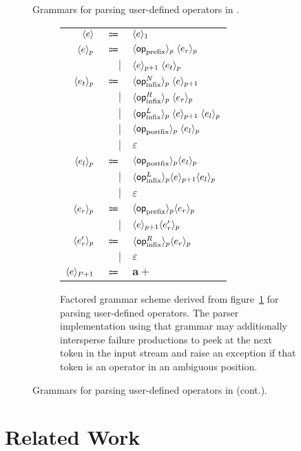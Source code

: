 {\begin{figure}[!htb]
\begin{subfigure}{\linewidth}
{}
\label{figure:user-defined-operators-initial-grammar-scheme}
\end{subfigure}
\caption[Grammars for parsing user-defined operators in \Beluga.]{Grammars for parsing user-defined operators in \Beluga.}
\label{figure:user-defined-operators-grammar}
\end{figure}%
\begin{figure}\ContinuedFloat
\begin{subfigure}{\linewidth}
\centering
\begin{tabular}{rrl}
$ \langle e\rangle $ & $ \Coloneqq $ & $ \langle e\rangle_1 $\\
$ \langle e\rangle_p $ & $ \Coloneqq $ & $ \langle\mathsf{op}_{\text{prefix}}\rangle_p \; \langle e_r\rangle_p $\\
& $ \mid $ & $ \langle e\rangle_{p + 1} \; \langle e_t\rangle_p $\\
$ \langle e_t\rangle_p $ & $ \Coloneqq $ & $ \langle\mathsf{op}_{\text{infix}}^N\rangle_p \; \langle e\rangle_{p + 1} $\\
& $ \mid $ & $ \langle\mathsf{op}_{\text{infix}}^R\rangle_p \; \langle e_r\rangle_p $\\
& $ \mid $ & $ \langle\mathsf{op}_{\text{infix}}^L\rangle_p \; \langle e\rangle_{p + 1} \; \langle e_l\rangle_p $\\
& $ \mid $ & $ \langle\mathsf{op}_{\text{postfix}}\rangle_p \; \langle e_l\rangle_p $\\
& $ \mid $ & $ \varepsilon $\\
$ \langle e_l\rangle_p $ & $ \Coloneqq $ & $ \langle\mathsf{op}_{\text{postfix}}\rangle_p \langle e_l\rangle_p $\\
& $ \mid $ & $ \langle\mathsf{op}_{\text{infix}}^L\rangle_p \langle e\rangle_{p + 1} \langle e_l\rangle_p $\\
& $ \mid $ & $ \varepsilon $\\
$ \langle e_r\rangle_p $ & $ \Coloneqq $ & $ \langle\mathsf{op}_{\text{prefix}}\rangle_p \langle e_r\rangle_p $\\
& $ \mid $ & $ \langle e\rangle_{p + 1} \langle e_r'\rangle_p $\\
$ \langle e_r'\rangle_p $ & $ \Coloneqq $ & $ \langle\mathsf{op}_{\text{infix}}^R\rangle_p \langle e_r\rangle_p $\\
& $ \mid $ & $ \varepsilon $\\
$ \langle e\rangle_{P + 1} $ & $ \Coloneqq $ & $ \mathbf{a}+ $
\end{tabular}
\caption{Factored grammar scheme derived from figure~\ref{figure:user-defined-operators-initial-grammar-scheme} for parsing user-defined operators. The parser implementation using that grammar may additionally intersperse failure productions to peek at the next token in the input stream and raise an exception if that token is an operator in an ambiguous position.}
\label{figure:user-defined-operators-final-grammar-scheme}
\end{subfigure}
\caption[]{Grammars for parsing user-defined operators in \Beluga (cont.).}
\end{figure}}

\section{Related Work}
